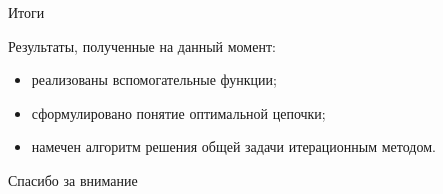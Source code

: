 
\begin{frame}{Итоги}


Результаты, полученные на данный момент:
\begin{itemize}
\item реализованы вспомогательные функции;
\item сформулировано понятие оптимальной цепочки;
\item намечен алгоритм решения общей задачи итерационным методом.
\end{itemize}
\end{frame}

\begin{frame}{}

\begin{center}
{\Huge Спасибо за внимание}
\end{center}

\end{frame}
